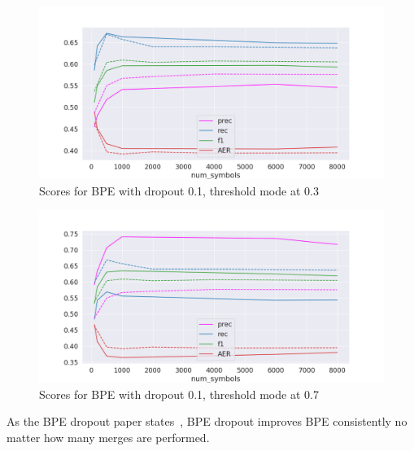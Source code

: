 \begin{figure}[!ht]
    \centering
    \includegraphics[width=11.5cm]{../reports/scores_dropout_bpe/space/0.1/0.3_thres_fastalign.png}
    \caption{Scores for BPE with dropout 0.1, threshold mode at 0.3}
\end{figure}

\begin{figure}[!ht]
    \centering
    \includegraphics[width=11.5cm]{../reports/scores_dropout_bpe/space/0.1/0.7_thres_fastalign.png}
    \caption{Scores for BPE with dropout 0.1, threshold mode at 0.7}
\end{figure}

As the BPE dropout paper states~\cite{provilkov2019bpedropout}, BPE dropout improves BPE consistently no matter how many merges are performed. 

